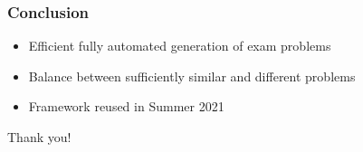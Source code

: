 \documentclass[xcolor={table}]{beamer}
\begin{document}

\begin{frame}
\frametitle{Conclusion}

  \begin{itemize}
    \item Efficient fully automated generation of exam problems %
    \item Balance between sufficiently similar and different problems
    \item Framework reused in Summer 2021
  \end{itemize}

\bigskip
\pause

\begin{center}
    Thank you!
\end{center}
\end{frame}

\end{document}
